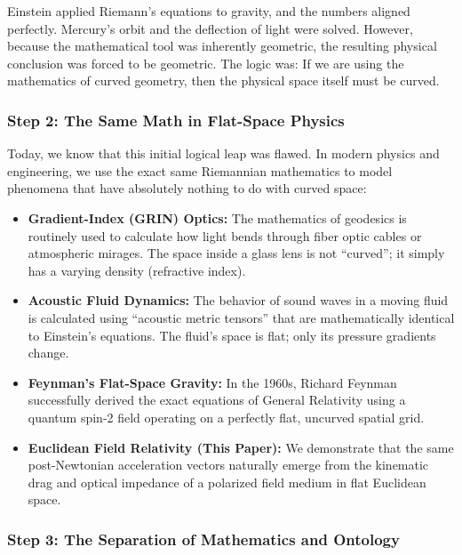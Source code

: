 \documentclass[
]{article}
\providecommand{\tightlist}{%
  \setlength{\itemsep}{0pt}\setlength{\parskip}{0pt}}
\begin{document}
Einstein applied Riemann's equations to gravity, and the numbers aligned
perfectly. Mercury's orbit and the deflection of light were solved.
However, because the mathematical tool was inherently geometric, the
resulting physical conclusion was forced to be geometric. The logic was:
If we are using the mathematics of curved geometry, then the physical
space itself must be curved.

\subsubsection{Step 2: The Same Math in Flat-Space
Physics}\label{step-2-the-same-math-in-flat-space-physics}

Today, we know that this initial logical leap was flawed. In modern
physics and engineering, we use the exact same Riemannian mathematics to
model phenomena that have absolutely nothing to do with curved space:

\begin{itemize}
\tightlist
\item
  \textbf{Gradient-Index (GRIN) Optics:} The mathematics of geodesics is
  routinely used to calculate how light bends through fiber optic cables
  or atmospheric mirages. The space inside a glass lens is not
  ``curved''; it simply has a varying density (refractive index).
\item
  \textbf{Acoustic Fluid Dynamics:} The behavior of sound waves in a
  moving fluid is calculated using ``acoustic metric tensors'' that are
  mathematically identical to Einstein's equations. The fluid's space is
  flat; only its pressure gradients change.
\item
  \textbf{Feynman's Flat-Space Gravity:} In the 1960s, Richard Feynman
  successfully derived the exact equations of General Relativity using a
  quantum spin-2 field operating on a perfectly flat, uncurved spatial
  grid.
\item
  \textbf{Euclidean Field Relativity (This Paper):} We demonstrate that
  the same post-Newtonian acceleration vectors naturally emerge from the
  kinematic drag and optical impedance of a polarized field medium in
  flat Euclidean space.
\end{itemize}

\subsubsection{Step 3: The Separation of Mathematics and
Ontology}\label{step-3-the-separation-of-mathematics-and-ontology}
\end{document}
